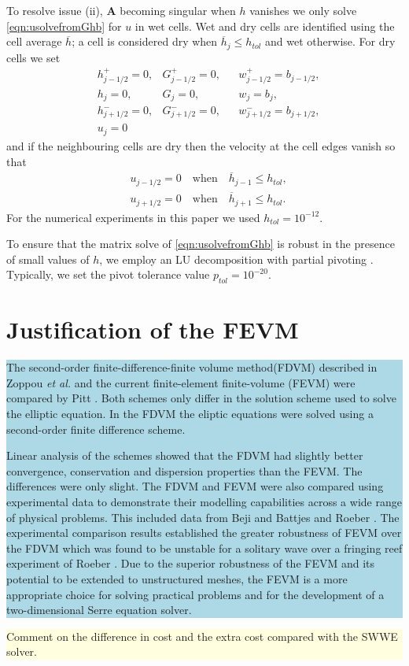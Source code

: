 \documentclass[times]{elsarticle}
\newcommand{\matr}[1]{\mathbf{#1}}
\newcommand{\hlb}[1] {\par\colorbox{lightblue}{\parbox{\linewidth}{#1}}}
\newcommand{\hly}[1] {\par\colorbox{lightyellow}{\parbox{\linewidth}{#1}}}
\newcommand{\hlb}[1] {{#1}}
\newcommand{\hly}[1] {{}}
\begin{document}
To resolve issue (ii), $\matr{A}$ becoming singular when $h$ vanishes we only solve \eqref{eqn:usolvefromGhb} for $u$ in wet cells. Wet and dry cells are identified using the cell average $\overline{h}$; a cell is considered dry when $\overline{h}_j \le h_{tol}$ and wet otherwise. For dry cells we set
\begin{align*}
& 	h^+_{j-1/2}  = 0,   & 	G^+_{j-1/2}  = 0, & & 	w^+_{j-1/2}  = b_{j-1/2},   \\
&	h_{j} = 0, & 	G_{j}  = 0,  & 	&w_{j}  = b_{j},\\
& 	h^-_{j+1/2}  = 0,  & 	G^-_{j+1/2}  = 0, & 	&w^-_{j+1/2}  = b_{j+1/2}, \\
& u_j = 0
\end{align*}
and if the neighbouring cells are dry then the velocity at the cell edges vanish so that
\begin{align*}
& 	u_{j-1/2}  = 0  \quad \text{when} \quad\overline{h}_{j-1}\le h_{tol}, \\
& 	u_{j+1/2}  = 0  \quad\text{when}\quad\overline{h}_{j+1} \le h_{tol}.
\end{align*}
For the numerical experiments in this paper we used $h_{tol} = 10^{-12}$.

To ensure that the matrix solve of \eqref{eqn:usolvefromGhb} is robust in the presence of small values of $h$, we employ an LU decomposition with partial pivoting \cite{NumRecC-1996}. Typically, we set the pivot tolerance value $p_{tol}=10^{-20}$.

\section{Justification of the FEVM}

\hlb{The second-order finite-difference-finite volume method(FDVM) described in Zoppou \emph{et al.}\cite{Zoppou-etal-2017} and the current finite-element finite-volume  (FEVM) were compared by Pitt \cite{Pitt-2019}. Both schemes only differ in the solution scheme used to solve the elliptic equation. In the FDVM the eliptic equations were solved using a second-order finite difference scheme.

Linear analysis of the schemes showed that the FDVM had slightly better convergence, conservation and dispersion properties than the FEVM. The differences were only slight. The FDVM and FEVM were also compared using experimental data to demonstrate their modelling capabilities across a wide range of physical problems. This included data from Beji and Battjes \cite{Beji-Battjes-1993-151} and Roeber \cite{Roeber-2010}. The experimental comparison results established the greater robustness of FEVM over the FDVM which was found to be unstable for a solitary wave over a fringing reef experiment of Roeber \cite{Roeber-2010}. Due to the superior robustness of the FEVM and its potential to be extended to unstructured meshes, the FEVM is a more appropriate choice for solving practical problems and for the development of a two-dimensional Serre equation solver.}
\hly{Comment on the difference in cost and the extra cost compared with the SWWE solver.}
\end{document}
